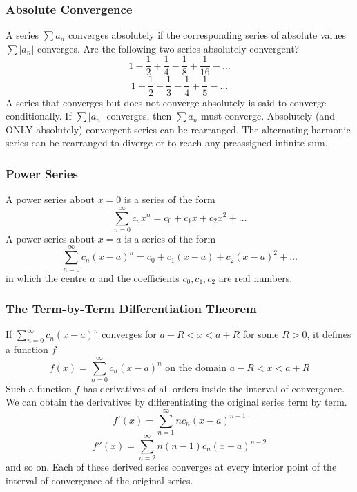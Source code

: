 \documentclass[xcolor=dvipsnames]{beamer}
\begin{document}
\begin{frame}
  \frametitle{Absolute Convergence}
  A series $\sum{}a_{n}$ \alert{converges absolutely} if the
  corresponding series of absolute values $\sum\vert{}a_{n}\vert$
  converges. Are the following two series absolutely convergent?
  \begin{equation}
    \label{eq:pheequie}
    1-\frac{1}{2}+\frac{1}{4}-\frac{1}{8}+\frac{1}{16}-{\ldots}
  \end{equation}
  \begin{equation}
    \label{eq:uaqueigh}
    1-\frac{1}{2}+\frac{1}{3}-\frac{1}{4}+\frac{1}{5}-{\ldots}
  \end{equation}
A series that converges but does not converge absolutely is said
to \alert{converge conditionally}. If $\sum\vert{}a_{n}\vert$
converges, then $\sum{}a_{n}$ must converge. Absolutely (and ONLY
absolutely) convergent series can be rearranged. The alternating
harmonic series can be rearranged to diverge or to reach any
preassigned infinite sum.
\end{frame}

\begin{frame}
  \frametitle{Power Series}
  A \alert{power series about $x=0$} is a series of the form
  \begin{equation}
    \label{eq:eecizaja}
    \sum_{n=0}^{\infty}c_{n}x^{n}=c_{0}+c_{1}x+c_{2}x^{2}+{\ldots}
  \end{equation}
  A \alert{power series about $x=a$} is a series of the form
  \begin{equation}
    \label{eq:coojudie}
    \sum_{n=0}^{\infty}c_{n}(x-a)^{n}=c_{0}+c_{1}(x-a)+c_{2}(x-a)^{2}+{\ldots}
  \end{equation}
in which the centre $a$ and the coefficients $c_{0},c_{1},c_{2}$ are real numbers.
\end{frame}

\begin{frame}
  \frametitle{The Term-by-Term Differentiation Theorem}
  If $\sum_{n=0}^{\infty}c_{n}(x-a)^{n}$ converges for $a-R<x<a+R$ for some $R>0$, it defines a function $f$
  \begin{equation}
    \label{eq:aengooph}
    f(x)=\sum_{n=0}^{\infty}c_{n}(x-a)^{n}\mbox{ on the domain }a-R<x<a+R
  \end{equation}
  Such a function $f$ has derivatives of all orders inside the interval of convergence. We can obtain the derivatives by differentiating the original series term by term.
  \begin{equation}
    \label{eq:eghoocah}
    f'(x)=\sum_{n=1}^{\infty}nc_{n}(x-a)^{n-1}
  \end{equation}
  \begin{equation}
    \label{eq:xalaixii}
    f''(x)=\sum_{n=2}^{\infty}n(n-1)c_{n}(x-a)^{n-2}
  \end{equation}
and so on. Each of these derived series converges at every interior point of the interval of convergence of the original series.
\end{frame}
\end{document}
